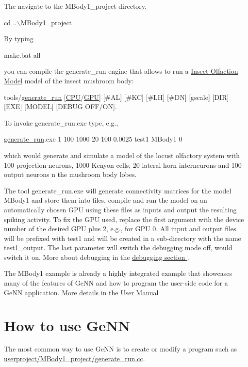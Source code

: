 The navigate to the {\ttfamily M\+Body1\+\_\+project} directory. 
\begin{DoxyCode}
cd ..\(\backslash\)MBody1\_project
\end{DoxyCode}
 By typing 
\begin{DoxyCode}
make.bat all
\end{DoxyCode}
 you can compile the {\ttfamily generate\+\_\+run} engine that allows to run a \hyperlink{Examples_ex_mbody}{Insect Olfaction Model} model of the insect mushroom body\+: 
\begin{DoxyCode}
tools/\hyperlink{userproject_2MBody__userdef__project_2README_8txt_a320a215d1e27b4de394be70e90d22863}{generate\_run} [\hyperlink{README_8txt_a74a069e3c75797de2636c4dd14daa147}{CPU}/\hyperlink{modelSpec_8h_a39cb9803524b6f3b783344b2f89867b4}{GPU}] [#AL] [#KC] [#LH] [#DN] [gscale] [DIR] [EXE] [MODEL] [DEBUG 
      OFF/ON]. 
\end{DoxyCode}
 To invoke {\ttfamily generate\+\_\+run.\+exe} type, e.\+g., 
\begin{DoxyCode}
\hyperlink{userproject_2MBody__userdef__project_2README_8txt_a320a215d1e27b4de394be70e90d22863}{generate\_run}.exe 1 100 1000 20 100 0.0025 test1 MBody1 0 
\end{DoxyCode}
 which would generate and simulate a model of the locust olfactory system with 100 projection neurons, 1000 Kenyon cells, 20 lateral horn interneurons and 100 output neurons n the mushroom body lobes.

The tool {\ttfamily generate\+\_\+run.\+exe} will generate connectivity matrices for the model {\ttfamily M\+Body1} and store them into files, compile and run the model on an automatically chosen G\+P\+U using these files as inputs and output the resulting spiking activity. To fix the G\+P\+U used, replace the first argument {} with the device number of the desired G\+P\+U plus 2, e.\+g., {} for G\+P\+U 0. All input and output files will be prefixed with {\ttfamily test1} and will be created in a sub-\/directory with the name {\ttfamily test1\+\_\+output}. The last parameter {} will switch the debugging mode off, {} would switch it on. More about debugging in the \hyperlink{}{debugging section }.

The M\+Body1 example is already a highly integrated example that showcases many of the features of Ge\+N\+N and how to program the user-\/side code for a Ge\+N\+N application. \hyperlink{Manual}{More details in the User Manual }\hypertarget{Quickstart_page_how_to}{}\section{How to use Ge\+N\+N}\label{Quickstart_page_how_to}
The most common way to use Ge\+N\+N is to create or modify a program such as {\ttfamily \hyperlink{userproject_2MBody1__project_2generate__run_8cc}{userproject/\+M\+Body1\+\_\+project/generate\+\_\+run.\+cc}}.

